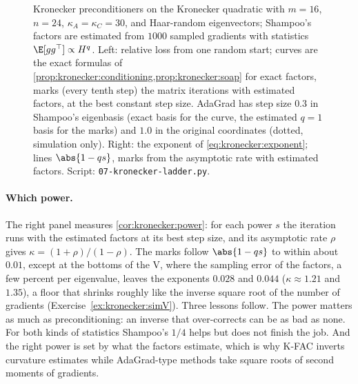 \begin{refsection}
\begin{figure}[t]
\begin{fullwidth}
\end{fullwidth}
\caption{Kronecker preconditioners on the Kronecker quadratic with $m=16$, $n=24$, $\kappa_A=\kappa_C=30$, and Haar-random eigenvectors; Shampoo's factors are estimated from $1000$ sampled gradients with statistics $\E[gg^\top]\propto H^q$. Left: relative loss from one random start; curves are the exact formulas of \cref{prop:kronecker:conditioning,prop:kronecker:soap} for exact factors, marks (every tenth step) the matrix iterations with estimated factors, at the best constant step size. AdaGrad has step size $0.3$ in Shampoo's eigenbasis (exact basis for the curve, the estimated $q=1$ basis for the marks) and $1.0$ in the original coordinates (dotted, simulation only). Right: the exponent of \eqref{eq:kronecker:exponent}; lines $\abs{1-qs}$, marks from the asymptotic rate with estimated factors. Script: \texttt{07-kronecker-ladder.py}.}
\label{fig:kronecker:ladder}
\end{figure}

\paragraph{Which power.} The right panel measures \cref{cor:kronecker:power}: for each power $s$ the iteration runs with the estimated factors at its best step size, and its asymptotic rate $\rho$ gives $\kappa=(1+\rho)/(1-\rho)$. The marks follow $\abs{1-qs}$ to within about $0.01$, except at the bottoms of the V, where the sampling error of the factors, a few percent per eigenvalue, leaves the exponents $0.028$ and $0.044$ ($\kappa\approx1.21$ and $1.35$), a floor that shrinks roughly like the inverse square root of the number of gradients (Exercise~\ref{ex:kronecker:simV}). Three lessons follow. The power matters as much as preconditioning: an inverse that over-corrects can be as bad as none. For both kinds of statistics Shampoo's $1/4$ helps but does not finish the job. And the right power is set by what the factors estimate, which is why K-FAC inverts curvature estimates while AdaGrad-type methods take square roots of second moments of gradients.


\end{refsection}
